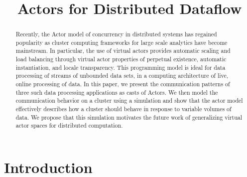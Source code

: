 \documentclass[conference,twocolumn,11pt]{IEEEtran}
\begin{document}
\title{Actors for Distributed Dataflow}


\author{

    \and

    \and
    }

\maketitle

\begin{abstract}
Recently, the Actor model of concurrency in distributed systems has regained popularity as cluster computing frameworks for large scale analytics have become mainstream. In particular, the use of virtual actors provides automatic scaling and load balancing through virtual actor properties of perpetual existence, automatic instantiation, and locale transparency. This programming model is ideal for data processing of streams of unbounded data sets, in a computing architecture of live, online processing of data. In this paper, we present the communication patterns of three such data processing applications as casts of Actors. We then model the communication behavior on a cluster using a simulation and show that the actor model effectively describes how a cluster should behave in response to variable volumes of data. We propose that this simulation motivates the future work of generalizing virtual actor spaces for distributed computation.
\end{abstract}

\section{Introduction}
\end{document}
